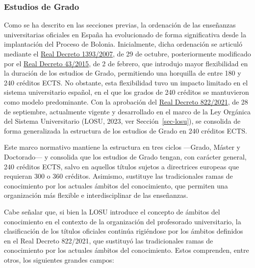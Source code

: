 \documentclass[
  11pt,
  a4paper,
  twoside]{scrreprt}
\begin{document}
\subsubsection{Estudios de Grado}\label{sec-grado}

Como se ha descrito en las secciones previas, la ordenación de las
enseñanzas universitarias oficiales en España ha evolucionado de forma
significativa desde la implantación del Proceso de Bolonia.
Inicialmente, dicha ordenación se articuló mediante el
\href{https://www.boe.es/buscar/act.php?id=BOE-A-2007-18770}{Real
Decreto 1393/2007}, de 29 de octubre, posteriormente modificado por el
\href{https://www.boe.es/buscar/doc.php?id=BOE-A-2015-943}{Real Decreto
43/2015}, de 2 de febrero, que introdujo mayor flexibilidad en la
duración de los estudios de Grado, permitiendo una horquilla de entre
180 y 240 créditos ECTS. No obstante, esta flexibilidad tuvo un impacto
limitado en el sistema universitario español, en el que los grados de
240 créditos se mantuvieron como modelo predominante. Con la aprobación
del \href{https://www.boe.es/buscar/act.php?id=BOE-A-2021-15781}{Real
Decreto 822/2021}, de 28 de septiembre, actualmente vigente y
desarrollado en el marco de la Ley Orgánica del Sistema Universitario
(LOSU, 2023, ver Sección~\ref{sec-losu}), se consolida de forma
generalizada la estructura de los estudios de Grado en 240 créditos
ECTS.

Este marco normativo mantiene la estructura en tres ciclos ---Grado,
Máster y Doctorado--- y consolida que los estudios de Grado tengan, con
carácter general, 240 créditos ECTS, salvo en aquellos títulos sujetos a
directrices europeas que requieran 300 o 360 créditos. Asimismo,
sustituye las tradicionales ramas de conocimiento por los actuales
ámbitos del conocimiento, que permiten una organización más flexible e
interdisciplinar de las enseñanzas.

Cabe señalar que, si bien la LOSU introduce el concepto de ámbitos del
conocimiento en el contexto de la organización del profesorado
universitario, la clasificación de los títulos oficiales continúa
rigiéndose por los ámbitos definidos en el Real Decreto 822/2021, que
sustituyó las tradicionales ramas de conocimiento por los actuales
ámbitos del conocimiento. Estos comprenden, entre otros, los siguientes
grandes campos:
\end{document}
